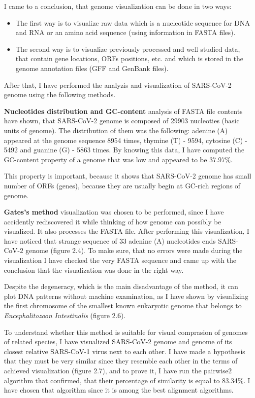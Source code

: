 I came to a conclusion, that genome visualization can be done in two ways:
\begin{itemize}
    \item The first way is to visualize raw data which is a nucleotide sequence for DNA and RNA or an amino acid sequence (using information in FASTA files).
    \item The second way is to visualize previously processed and well studied data, that contain gene locations, ORFs positions, etc. and which is stored in the genome annotation files (GFF and GenBank files).
\end{itemize}

After that, I have performed the analyzis and visualization of SARS-CoV-2 genome using the following methods.

\textbf{Nucleotides distribution and GC-content} analysis of FASTA file contents have shown, that SARS-CoV-2 genome is composed of 29903 nucleoties (basic units of genome).
The distribution of them was the following: adenine (A) appeared at the genome sequence 8954 times, thymine (T) - 9594, cytosine (C) - 5492 and  guanine (G) - 5863 times.
By knowing this data, I have computed the GC-content property of a genome that was low and appeared to be 37.97\%.

This property is important, because it shows that SARS-CoV-2 genome has small number of ORFs (genes), because they are usually begin at GC-rich regions of genome.

\textbf{Gates's method} visualization was chosen to be performed, since I have accidently rediscovered it while thinking of how genome can possibly be visualized.
It also processes the FASTA file.
After performing this visualization, I have noticed that strange sequence of 33 adenine (A) nucleotides ends SARS-CoV-2 genome (figure 2.4).
To make sure, that no errors were made during the visualization I have checked the very FASTA sequence and came up with the conclusion that the visualization was done in the right way.
    
Despite the degeneracy, which is the main disadvantage of the method, it can plot DNA patterns without machine examination, as I have shown by visualizing the first chromosome of the smallest known eukaryotic genome that belongs to \textit{Encephalitozoon Intestinalis} (figure 2.6).

To understand whether this method is suitable for visual comprasion of genomes of related species, I have visualized SARS-CoV-2 genome and genome of its closest relative SARS-CoV-1 virus next to each other.
I have made a hypothesis that they must be very similar since they resemble each other in the terms of achieved visualization (figure 2.7), and to prove it, I have run the pairwise2 algorithm that confirmed, that their percentage of similarity is equal to 83.34\%.
I have chosen that algorithm since it is among the best alignment algorithms.

